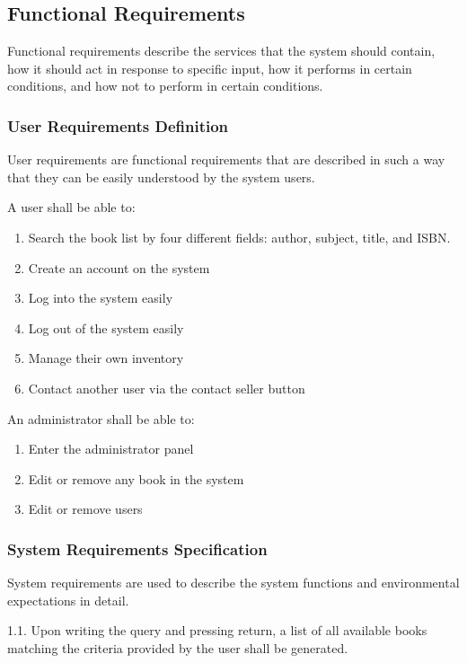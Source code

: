 \documentclass[11pt]{article}
\begin{document}
\subsection{Functional Requirements}
\label{sec:functional-reqs}

Functional requirements describe the services that the system should
contain, how it should act in response to specific input, how it
performs in certain conditions, and how not to perform in certain
conditions.

\subsubsection{User Requirements Definition}
\label{sec:user-reqs}

User requirements are functional requirements that are described in
such a way that they can be easily understood by the system users.

A user shall be able to:

\begin{enumerate}
\item Search the book list by four different fields: author, subject, title, and ISBN. 
\item Create an account on the system
\item Log into the system easily
\item Log out of the system easily
\item Manage their own inventory
\item Contact another user via the contact seller button
\end{enumerate}

An administrator shall be able to:

\begin{enumerate}
\item Enter the administrator panel
\item Edit or remove any book in the system
\item Edit or remove users
\end{enumerate}

\subsubsection{System Requirements Specification}
\label{sec:sys-reqs}

System requirements are used to describe the system functions and
environmental expectations in detail.

1.1. Upon writing the query and pressing return, a list of all
    available books matching the criteria provided by the user shall
    be generated.
\end{document}
